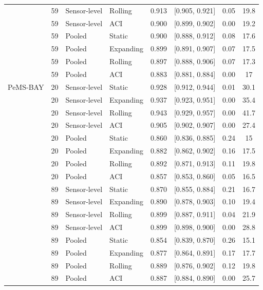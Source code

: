 \begin{table}[htbp]
\begin{tabular}{llllcccc}
 & 59 & Sensor-level & Rolling & 0.913 & [0.905, 0.921] & 0.05 & 19.8 \\
 & 59 & Sensor-level & ACI & 0.900 & [0.899, 0.902] & 0.00 & 19.2 \\
 & 59 & Pooled & Static & 0.900 & [0.888, 0.912] & 0.08 & 17.6 \\
 & 59 & Pooled & Expanding & 0.899 & [0.891, 0.907] & 0.07 & 17.5 \\
 & 59 & Pooled & Rolling & 0.897 & [0.888, 0.906] & 0.07 & 17.3 \\
 & 59 & Pooled & ACI & 0.883 & [0.881, 0.884] & 0.00 & 17 \\
\midrule
PeMS-BAY & 20 & Sensor-level & Static & 0.928 & [0.912, 0.944] & 0.01 & 30.1 \\
 & 20 & Sensor-level & Expanding & 0.937 & [0.923, 0.951] & 0.00 & 35.4 \\
 & 20 & Sensor-level & Rolling & 0.943 & [0.929, 0.957] & 0.00 & 41.7 \\
 & 20 & Sensor-level & ACI & 0.905 & [0.902, 0.907] & 0.00 & 27.4 \\
 & 20 & Pooled & Static & 0.860 & [0.836, 0.885] & 0.24 & 15 \\
 & 20 & Pooled & Expanding & 0.882 & [0.862, 0.902] & 0.16 & 17.5 \\
 & 20 & Pooled & Rolling & 0.892 & [0.871, 0.913] & 0.11 & 19.8 \\
 & 20 & Pooled & ACI & 0.857 & [0.853, 0.860] & 0.05 & 16.5 \\
 & 89 & Sensor-level & Static & 0.870 & [0.855, 0.884] & 0.21 & 16.7 \\
 & 89 & Sensor-level & Expanding & 0.890 & [0.878, 0.903] & 0.10 & 19.4 \\
 & 89 & Sensor-level & Rolling & 0.899 & [0.887, 0.911] & 0.04 & 21.9 \\
 & 89 & Sensor-level & ACI & 0.899 & [0.898, 0.900] & 0.00 & 28.8 \\
 & 89 & Pooled & Static & 0.854 & [0.839, 0.870] & 0.26 & 15.1 \\
 & 89 & Pooled & Expanding & 0.877 & [0.864, 0.891] & 0.17 & 17.7 \\
 & 89 & Pooled & Rolling & 0.889 & [0.876, 0.902] & 0.12 & 19.8 \\
 & 89 & Pooled & ACI & 0.887 & [0.884, 0.890] & 0.00 & 25.7 \\
\bottomrule
\end{tabular}
\end{table}

